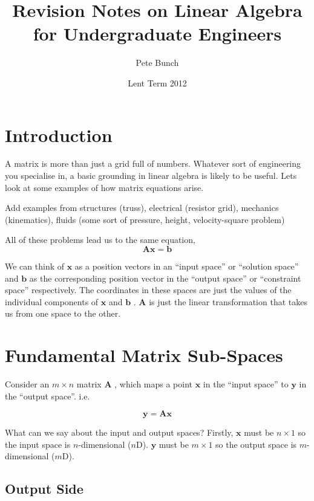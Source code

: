 \documentclass[a4paper,10pt]{article}
\title{Revision Notes on Linear Algebra for Undergraduate Engineers}
\author{Pete Bunch}
\date{Lent Term 2012}
\newcommand{\mA}{$\mathbf{A}$ }
\newcommand{\vb}{$\mathbf{b}$ }
\newcommand{\vx}{$\mathbf{x}$ }
\newcommand{\vy}{$\mathbf{y}$ }
\begin{document}
\maketitle

\section{Introduction}

A matrix is more than just a grid full of numbers. Whatever sort of engineering you specialise in, a basic grounding in linear algebra is likely to be useful. Lets look at some examples of how matrix equations arise.

{\meta Add examples from structures (truss), electrical (resistor grid), mechanics (kinematics), fluids (some sort of pressure, height, velocity-square problem)}

All of these problems lead us to the same equation,
%
\begin{equation}
 \mathbf{A x} = \mathbf{b}
\end{equation}

We can think of \vx as a position vectors in an ``input space'' or ``solution space'' and \vb as the corresponding position vector in the ``output space'' or ``constraint space'' respectively. The coordinates in these spaces are just the values of the individual components of \vx and \vb. \mA is just the linear transformation that takes us from one space to the other.



\section{Fundamental Matrix Sub-Spaces}

Consider an $m \times n$ matrix \mA, which maps a point \vx in the ``input space'' to \vy in the ``output space''. i.e.

\begin{equation}
 \mathbf{y} = \mathbf{A x}
\end{equation}

What can we say about the input and output spaces? Firstly, \vx must be $n \times 1$ so the input space is $n$-dimensional ($n$D). \vy must be $m \times 1$ so the output space is $m$-dimensional ($m$D).

\subsection{Output Side}
\end{document}
